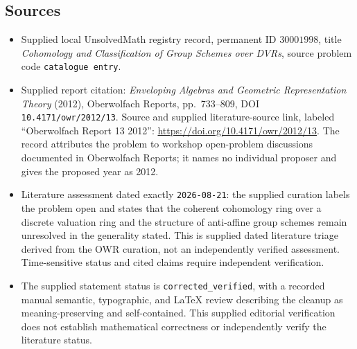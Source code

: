 \documentclass[11pt]{article}
\begin{document}
\subsection{Sources}
\begin{itemize}
\item Supplied local UnsolvedMath registry record, permanent ID \(30001998\), title \emph{Cohomology and Classification of Group Schemes over DVRs}, source problem code \texttt{catalogue entry}.
\item Supplied report citation: \emph{Enveloping Algebras and Geometric Representation Theory} (2012), Oberwolfach Reports, pp.\ 733--809, DOI \texttt{10.4171/owr/2012/13}. Source and supplied literature-source link, labeled ``Oberwolfach Report 13 2012'': \url{https://doi.org/10.4171/owr/2012/13}. The record attributes the problem to workshop open-problem discussions documented in Oberwolfach Reports; it names no individual proposer and gives the proposed year as 2012.
\item Literature assessment dated exactly \texttt{2026-08-21}: the supplied curation labels the problem open and states that the coherent cohomology ring over a discrete valuation ring and the structure of anti-affine group schemes remain unresolved in the generality stated. This is supplied dated literature triage derived from the OWR curation, not an independently verified assessment. Time-sensitive status and cited claims require independent verification.
\item The supplied statement status is \texttt{corrected\_verified}, with a recorded manual semantic, typographic, and LaTeX review describing the cleanup as meaning-preserving and self-contained. This supplied editorial verification does not establish mathematical correctness or independently verify the literature status.
\end{itemize}
\end{document}
